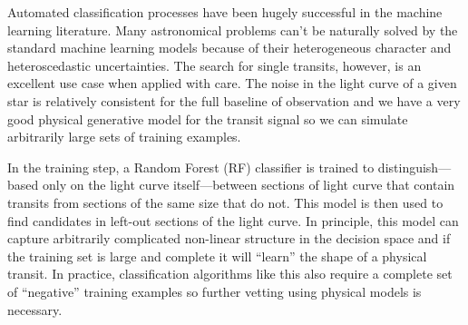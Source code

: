 \documentclass[12pt,preprint]{aastex}
\newcommand{\project}[1]{\textsl{#1}}
\newcommand{\kepler}{\project{Kepler}}
\newcommand{\paper}{article}
\newcommand{\figlabel}[1]{\label{fig:#1}}
\newcommand{\sectionname}{Section}
\newcommand{\sectref}[1]{\ref{sect:#1}}
\newcommand{\Sect}[1]{\sectionname~\sectref{#1}}
\newcommand{\sect}[1]{\Sect{#1}}
\newcommand{\todo}[3]{{\color{#2}\emph{#1}: #3}}
\newcommand{\dfmtodo}[1]{\todo{DFM}{red}{#1}}
\begin{document}
Automated classification processes have been hugely successful in the machine
learning literature.
Many astronomical problems can't be naturally solved by the standard machine
learning models because of their heterogeneous character and heteroscedastic
uncertainties.
The search for single transits, however, is an excellent use case when applied
with care.
The noise in the light curve of a given star is relatively consistent for the
full baseline of observation and we have a very good physical generative model
for the transit signal so we can simulate arbitrarily large sets of training
examples.

In the training step, a Random Forest (RF) classifier is trained to
distinguish---based only on the light curve itself---between sections of light
curve that contain transits from sections of the same size that do not.
This model is then used to find candidates in left-out sections of the light
curve.
In principle, this model can capture arbitrarily complicated non-linear
structure in the decision space and if the training set is large and complete
it will ``learn'' the shape of a physical transit.
In practice, classification algorithms like this also require a complete set
of ``negative'' training examples so further vetting using physical models
is necessary.





\clearpage

\clearpage


\end{document}
